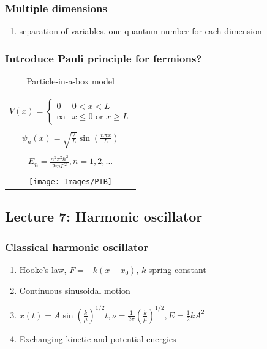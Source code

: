 \documentclass[11pt]{article}
\begin{document}
\subsubsection{Multiple dimensions}
\label{sec:org4560b86}
\begin{enumerate}
\item separation of variables, one quantum number for each dimension
\end{enumerate}
\subsubsection{Introduce Pauli principle for fermions?}
\label{sec:orga5f969c}

\begin{table}[tb]
   \begin{center}
   \caption{Particle-in-a-box model}
    \label{Particle-in-a-box}
\begin{tabular}[h]{|c|}
\hline
 \\
$\displaystyle       V(x) = \left \{
        \begin{array}{rl}
          0 & 0 < x < L \\
          \infty & x \leq 0 \text{ or } x \geq L
        \end{array} \right . $ \\
 \\
$\displaystyle     \psi_n(x) =\sqrt{\frac{2}{L}} \sin \left ( \frac{n\pi x}{L} \right )$
\\ 
 \\
$\displaystyle     E_n =\frac{n^2\pi^2\hbar^2}{2mL^2}, n = 1, 2, ...$ \\
 \\
     \texttt{[image: Images/PIB]} \\       
\hline
\end{tabular}
 \end{center}
\end{table}

\subsection{Lecture 7: Harmonic oscillator}
\label{sec:orgc5e851e}
\subsubsection{Classical harmonic oscillator}
\label{sec:orgf78280a}
\begin{enumerate}
\item Hooke's law, \(F=-k(x-x_0)\), \(k\) spring constant
\item Continuous sinusoidal motion
\item \(x(t)=A \sin(\frac{k}{\mu})^{1/2}t, \nu=\frac{1}{2\pi}(\frac{k}{\mu})^{1/2}, E=\frac{1}{2}kA^2\)
\item Exchanging kinetic and potential energies
\end{enumerate}
\end{document}
